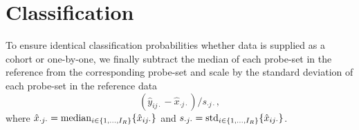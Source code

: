\section{Classification}
To ensure identical classification probabilities whether data is supplied as a cohort or one-by-one, we finally subtract the median of each probe-set in the reference from the corresponding probe-set and scale by the standard deviation of each probe-set in the reference data
\begin{equation*}
  (\hat{y}_{ij\cdot} - \hat{x}_{\cdot j\cdot})/s_{\cdot j\cdot},
\end{equation*}
where
$\hat{x}_{\cdot j\cdot} = \operatorname*{median}_{i \in \{1,\dots,I_R \}} \{\hat{x}_{ij\cdot}\}$ and $s_{\cdot j\cdot} = \operatorname*{std}_{i \in \{1,\dots,I_R\}} \{\hat{x}_{ij\cdot}\}$.


% 